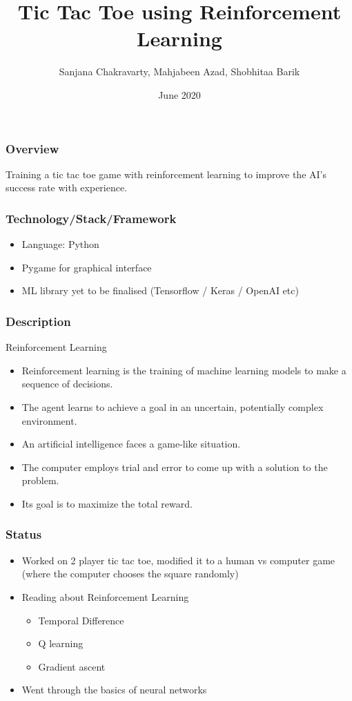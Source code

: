 \documentclass{beamer}
\title{Tic Tac Toe using Reinforcement Learning}
\author[Group 12]{Sanjana Chakravarty, Mahjabeen Azad, Shobhitaa Barik}
\date{June 2020}
\begin{document}
\begin{frame}
    \titlepage
\end{frame}

\begin{frame}
    \frametitle{Overview}
    Training a tic tac toe game with reinforcement learning to improve the AI’s success rate with experience.
\end{frame}

\begin{frame}
    \frametitle{Technology/Stack/Framework}
        \begin{itemize}
            \item Language: Python
            \item Pygame for graphical interface 
            \item ML library yet to be finalised (Tensorflow / Keras / OpenAI etc)
        \end{itemize}
\end{frame}

\begin{frame}
    \frametitle{Description}
    \begin{block}{Reinforcement Learning}        
        \begin{itemize}
            \item<1-> Reinforcement learning is the training of machine learning models to make a sequence of decisions.
            \item<2-> The agent learns to achieve a goal in an uncertain, potentially complex environment.
            \item<3-> An artificial intelligence faces a game-like situation.
            \item<4-> The computer employs trial and error to come up with a solution to the problem.
            \item<5-> Its goal is to maximize the total reward.
        \end{itemize}
    \end{block}
\end{frame}

\begin{frame}
    \frametitle{Status}
    \begin{itemize}
        \item Worked on 2 player tic tac toe, modified it to a human vs computer game (where the computer chooses the square randomly)
        \item Reading about Reinforcement Learning 
            \begin{itemize}
                \item Temporal Difference
                \item Q learning
                \item Gradient ascent
            \end{itemize}
        \item Went through the basics of neural networks
    \end{itemize}
\end{frame}
\end{document}
